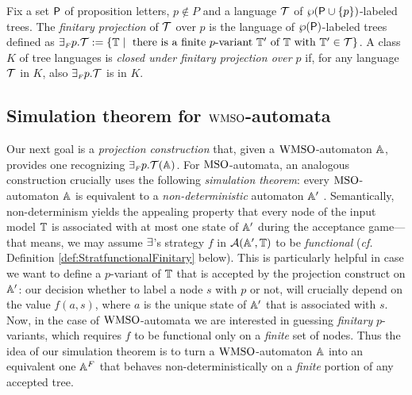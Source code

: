 \begin{definition}\label{def:tree_finproj}
Fix a set $\mathsf{P}$ of proposition letters, $p \not\in P$ and a language $\mathcal{T}$ 
of $\wp (\mathsf{P}\cup\{p\})$-labeled trees.
The \emph{finitary projection} of $\mathcal{T}$ over $p$ is the language of $\wp 
(\mathsf{P})$-labeled trees defined as ${\finexists} p.\trees \df \{\bbT \mid
\text{ there is a finite $p$-variant } \bbT' \text{ of } \bbT \text{ with } 
\bbT' \in \trees\}$.
%
A class $K$ of tree languages is \emph{closed under finitary projection
over $p$} if, for any language $\mathcal{T}$ in $K$, also ${{\exists_{{\scriptscriptstyle F}}} p}.\mathcal{T}$ 
is in $K$.
\end{definition} 



\subsection{Simulation theorem for $\mathrm{WMSO}$-automata}\label{sec:simulationwmso}

\noindent 
Our next goal is a \emph{projection construction} that, given a $\mathrm{WMSO}$-automaton
$\mathbb{A}$, provides one recognizing ${\exists_{{\scriptscriptstyle F}} p}.\mathcal{T}(\mathbb{A})$. 
For $\mathrm{MSO}$-automata, an analogous construction crucially uses the following 
\emph{simulation theorem}: every $\mathrm{MSO}$-automaton $\mathbb{A}$ is equivalent to a 
\emph{non-deterministic} automaton $\mathbb{A}'$ \cite{Walukiewicz96}.
Semantically, non-determinism yields the appealing property that every node of 
the input model $\mathbb{T}$ is associated with at most one state of $\mathbb{A}'$ during 
the acceptance game--- that means, we may assume $\exists$'s strategy $f$ in 
$\mathcal{A}(\mathbb{A}',\mathbb{T})$ to be \emph{functional} (\emph{cf.} 
Definition \ref{def:StratfunctionalFinitary} below). 
This is particularly helpful in case we want to define a $p$-variant of $\mathbb{T}$
that is accepted by the projection construct on $\mathbb{A}'$: our decision whether
to label a node $s$ with $p$ or not, will crucially depend on the value 
$f(a,s)$, where $a$ is the unique state of $\mathbb{A}'$ that is associated with $s$. 
Now, in the case of $\mathrm{WMSO}$-automata we are interested in guessing
\emph{finitary} $p$-variants, which requires $f$ to be functional only on a 
\emph{finite} set of nodes. 
Thus the idea of our simulation theorem is to turn a $\mathrm{WMSO}$-automaton $\mathbb{A}$ 
into an equivalent one $\mathbb{A}^{F}$ that behaves non-deterministically on a 
\emph{finite} portion of any accepted tree.


